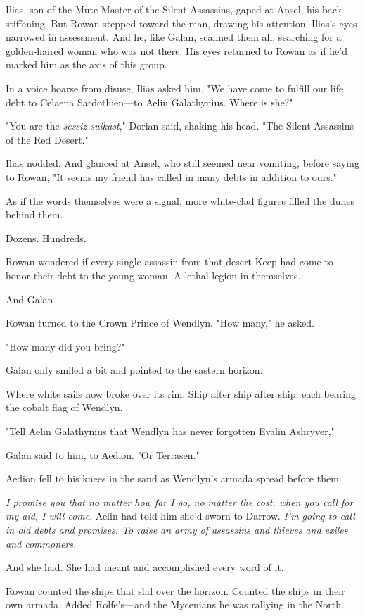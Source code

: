 Ilias, son of the Mute Master of the Silent Assassins, gaped at Ansel, his back stiffening. But Rowan stepped toward the man, drawing his attention. Ilias's eyes narrowed in assessment. And he, like Galan, scanned them all, searching for a golden-haired woman who was not there. His eyes returned to Rowan as if he'd marked him as the axis of this group.

In a voice hoarse from disuse, Ilias asked him, "We have come to fulfill our life debt to Celaena Sardothien---to Aelin Galathynius. Where is she?"

"You are the \emph{sessiz suikast}," Dorian said, shaking his head. "The Silent Assassins of the Red Desert."

Ilias nodded. And glanced at Ansel, who still seemed near vomiting, before saying to Rowan, "It seems my friend has called in many debts in addition to ours."

As if the words themselves were a signal, more white-clad figures filled the dunes behind them.

Dozens. Hundreds.

Rowan wondered if every single assassin from that desert Keep had come to honor their debt to the young woman. A lethal legion in themselves.

And Galan 

Rowan turned to the Crown Prince of Wendlyn. "How many," he asked.

"How many did you bring?"

Galan only smiled a bit and pointed to the eastern horizon.

Where white sails now broke over its rim. Ship after ship after ship, each bearing the cobalt flag of Wendlyn.

"Tell Aelin Galathynius that Wendlyn has never forgotten Evalin Ashryver,"

Galan said to him, to Aedion. "Or Terrasen."

Aedion fell to his knees in the sand as Wendlyn's armada spread before them.

\emph{I promise you that no matter how far I go, no matter the cost, when you call for my aid, I will come}, Aelin had told him she'd sworn to Darrow. \emph{I'm going to call in old debts and promises. To raise an army of assassins and thieves and exiles and commoners.}

And she had. She had meant and accomplished every word of it.

Rowan counted the ships that slid over the horizon. Counted the ships in their own armada. Added Rolfe's---and the Mycenians he was rallying in the North.

